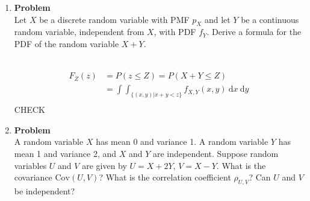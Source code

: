 \documentclass[12pt]{article}
\newenvironment{Ex}{\textbf{Problem}\vspace{.75em}\\}{}
\newcommand{\dd}[1]{\:\mathrm{d}{#1}}
\begin{document}
\begin{enumerate}
\begin{Ex}
\begin{solution}
      \begin{equation}
        \label{eq:2-presol}
        \begin{aligned}
          F_Y(y) &= P(Y\le y) = P(F_X(x)\le y) \\
          &= \int_{\{x|F_X(X) \le y\}}f_X(x) \dd{x} \\
        \end{aligned}
      \end{equation}
      The distribution is then the derivative of the CDF of $Y$.
      \begin{equation}
        \label{eq:2-sol}
        \implies f_Y(y) = \frac{d}{\dd{y}}\int_{\{x|F_X(X) \le
          y\}}f_X(x) \dd{x}
      \end{equation}
      {\color{red} \huge CHECK}
    \end{solution}
  \end{Ex}
\item
  \begin{Ex}
    Let $X$ be a discrete random variable with PMF $p_X$ and let $Y$
    be a continuous random variable, independent from $X$, with PDF
    $f_Y$. Derive a formula for the PDF of the random variable $X+Y$.
    \begin{solution} \hfill \vspace{.75em} \\
      \begin{equation}
        \label{eq:3-sol}
        \begin{aligned}
          F_Z(z) &= P(z \le Z) = P(X+Y \le Z) \\
          &= \int \int_{\{(x,y) | x+y<z\}} f_{X,Y}(x,y)\dd{x}\dd{y} \\
        \end{aligned}
      \end{equation}
      {\color{red} \huge CHECK}
    \end{solution}
  \end{Ex}
\item
  \begin{Ex}
    A random variable $X$ has mean 0 and variance 1. A random variable
    $Y$ has mean 1 and variance 2, and $X$ and $Y$ are
    independent. Suppose random variables $U$ and $V$ are given by
    $U=X+2Y$, $V = X−Y$. What is the covariance $\text{Cov}(U,V)$?
    What is the correlation coefficient $\rho_{U,V}$? Can $U$ and $V$
    be independent?
    \begin{solution} \hfill \vspace{.75em} \\

\end{solution}
\end{Ex}
\end{enumerate}
\end{document}

